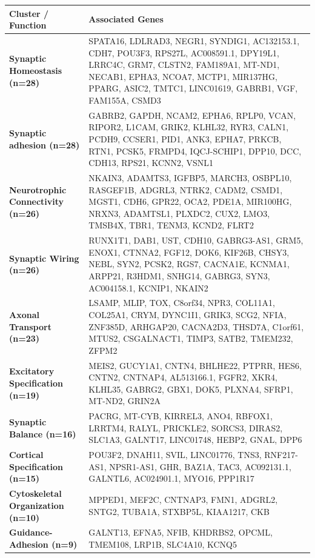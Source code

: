 \begin{longtable}{p{} p{}}
\hline
\textbf{Cluster / Function} & \textbf{Associated Genes} \\
\hline
\endhead
\textbf{Synaptic Homeostasis (n=28)} & SPATA16,  LDLRAD3,  NEGR1,  SYNDIG1,  AC132153.1,  CDH7,  POU3F3,  RPS27L,  AC008591.1,  DPY19L1,  LRRC4C,  GRM7,  CLSTN2,  FAM189A1,  MT-ND1,  NECAB1,  EPHA3,  NCOA7,  MCTP1,  MIR137HG,  PPARG,  ASIC2,  TMTC1,  LINC01619,  GABRB1,  VGF,  FAM155A,  CSMD3 \\
\hline
\textbf{Synaptic adhesion (n=28)} & GABRB2,  GAPDH,  NCAM2,  EPHA6,  RPLP0,  VCAN,  RIPOR2,  L1CAM,  GRIK2,  KLHL32,  RYR3,  CALN1,  PCDH9,  CCSER1,  PID1,  ANK3,  EPHA7,  PRKCB,  RTN1,  PCSK5,  FRMPD4,  IQCJ-SCHIP1,  DPP10,  DCC,  CDH13,  RPS21,  KCNN2,  VSNL1 \\
\hline
\textbf{Neurotrophic Connectivity (n=26)} & NKAIN3,  ADAMTS3,  IGFBP5,  MARCH3,  OSBPL10,  RASGEF1B,  ADGRL3,  NTRK2,  CADM2,  CSMD1,  MGST1,  CDH6,  GPR22,  OCA2,  PDE1A,  MIR100HG,  NRXN3,  ADAMTSL1,  PLXDC2,  CUX2,  LMO3,  TMSB4X,  TBR1,  TENM3,  KCND2,  FLRT2 \\
\hline
\textbf{Synaptic Wiring (n=26)} & RUNX1T1,  DAB1,  UST,  CDH10,  GABRG3-AS1,  GRM5,  ENOX1,  CTNNA2,  FGF12,  DOK6,  KIF26B,  CHSY3,  NEBL,  SYN2,  PCSK2,  RGS7,  CACNA1E,  KCNMA1,  ARPP21,  R3HDM1,  SNHG14,  GABRG3,  SYN3,  AC004158.1,  KCNIP1,  NKAIN2 \\
\hline
\textbf{Axonal Transport (n=23)} & LSAMP,  MLIP,  TOX,  C8orf34,  NPR3,  COL11A1,  COL25A1,  CRYM,  DYNC1I1,  GRIK3,  SCG2,  NFIA,  ZNF385D,  ARHGAP20,  CACNA2D3,  THSD7A,  C1orf61,  MTUS2,  CSGALNACT1,  TIMP3,  SATB2,  TMEM232,  ZFPM2 \\
\hline
\textbf{Excitatory Specification (n=19)} & MEIS2,  GUCY1A1,  CNTN4,  BHLHE22,  PTPRR,  HES6,  CNTN2,  CNTNAP4,  AL513166.1,  FGFR2,  XKR4,  KLHL35,  GABRG2,  GBX1,  DOK5,  PLXNA4,  SFRP1,  MT-ND2,  GRIN2A \\
\hline
\textbf{Synaptic Balance (n=16)} & PACRG,  MT-CYB,  KIRREL3,  ANO4,  RBFOX1,  LRRTM4,  RALYL,  PRICKLE2,  SORCS3,  DIRAS2,  SLC1A3,  GALNT17,  LINC01748,  HEBP2,  GNAL,  DPP6 \\
\hline
\textbf{Cortical Specification (n=15)} & POU3F2,  DNAH11,  SVIL,  LINC01776,  TNS3,  RNF217-AS1,  NPSR1-AS1,  GHR,  BAZ1A,  TAC3,  AC092131.1,  GALNTL6,  AC024901.1,  MYO16,  PPP1R17 \\
\hline
\textbf{Cytoskeletal Organization (n=10)} & MPPED1,  MEF2C,  CNTNAP3,  FMN1,  ADGRL2,  SNTG2,  TUBA1A,  STXBP5L,  KIAA1217,  CKB \\
\hline
\textbf{Guidance-Adhesion (n=9)} & GALNT13,  EFNA5,  NFIB,  KHDRBS2,  OPCML,  TMEM108,  LRP1B,  SLC4A10,  KCNQ5 \\
\hline
\end{longtable}
